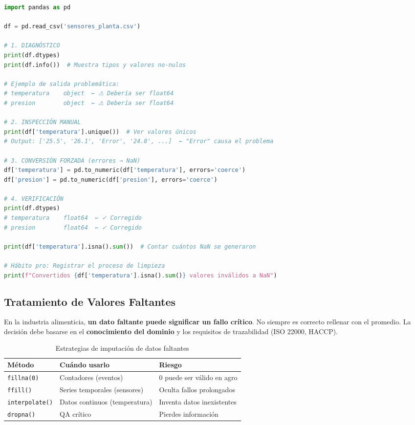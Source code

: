 \documentclass[11pt, a4paper]{article}
\begin{document}
\begin{lstlisting}[language=Python, caption={Diagnóstico y corrección de tipos}]
import pandas as pd

df = pd.read_csv('sensores_planta.csv')

# 1. DIAGNÓSTICO
print(df.dtypes)
print(df.info())  # Muestra tipos y valores no-nulos

# Ejemplo de salida problemática:
# temperatura    object  ← ⚠ Debería ser float64
# presion        object  ← ⚠ Debería ser float64

# 2. INSPECCIÓN MANUAL
print(df['temperatura'].unique())  # Ver valores únicos
# Output: ['25.5', '26.1', 'Error', '24.8', ...]  ← "Error" causa el problema

# 3. CONVERSIÓN FORZADA (errores → NaN)
df['temperatura'] = pd.to_numeric(df['temperatura'], errors='coerce')
df['presion'] = pd.to_numeric(df['presion'], errors='coerce')

# 4. VERIFICACIÓN
print(df.dtypes)
# temperatura    float64  ← ✓ Corregido
# presion        float64  ← ✓ Corregido

print(df['temperatura'].isna().sum())  # Contar cuántos NaN se generaron

# Hábito pro: Registrar el proceso de limpieza
print(f"Convertidos {df['temperatura'].isna().sum()} valores inválidos a NaN")
\end{lstlisting}

\subsection{Tratamiento de Valores Faltantes}

En la industria alimenticia, \textbf{un dato faltante puede significar un fallo crítico}. No siempre es correcto rellenar con el promedio. La decisión debe basarse en el \textbf{conocimiento del dominio} y los requisitos de trazabilidad (ISO 22000, HACCP).

\begin{table}[h]
\centering
\begin{tabular}{@{}lp{6cm}p{5cm}@{}}
\toprule
\textbf{Método} & \textbf{Cuándo usarlo} & \textbf{Riesgo} \\
\midrule
\texttt{fillna(0)} & Contadores (eventos) & 0 puede ser válido en agro \\
\texttt{ffill()} & Series temporales (sensores) & Oculta fallos prolongados \\
\texttt{interpolate()} & Datos continuos (temperatura) & Inventa datos inexistentes \\
\texttt{dropna()} & QA crítico & Pierdes información \\
\bottomrule
\end{tabular}
\caption{Estrategias de imputación de datos faltantes}
\end{table}
\end{document}
